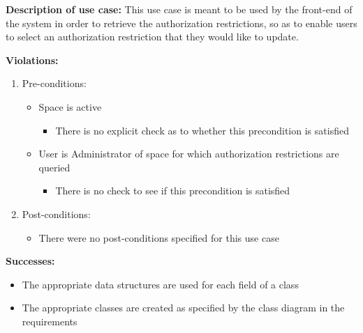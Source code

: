 \textbf{Description of use case:}\newline
This use case is meant to be used by the front-end of the system in order to retrieve the authorization restrictions, so as to enable users to select an authorization restriction that they would like to update.
\medskip

\textbf{Violations:}
\begin{enumerate}
	\item Pre-conditions:
	
	\begin{itemize}
		\item Space is active
		\begin{itemize}
				\item There is no explicit check as to whether this precondition is satisfied
		\end{itemize}
		\item User is Administrator of space for which authorization restrictions are queried
		\begin{itemize}
				\item There is no check to see if this precondition is satisfied
		\end{itemize}
	\end{itemize}
	
	\item Post-conditions:
	\begin{itemize}
		\item There were no post-conditions specified for this use case
	\end{itemize}
		
\end{enumerate}

\textbf{Successes:}
\begin{itemize}
	\item The appropriate data structures are used for each field of a class
	\item The appropriate classes are created as specified by the class diagram in the requirements
\end{itemize}


\noindent
\medskip

